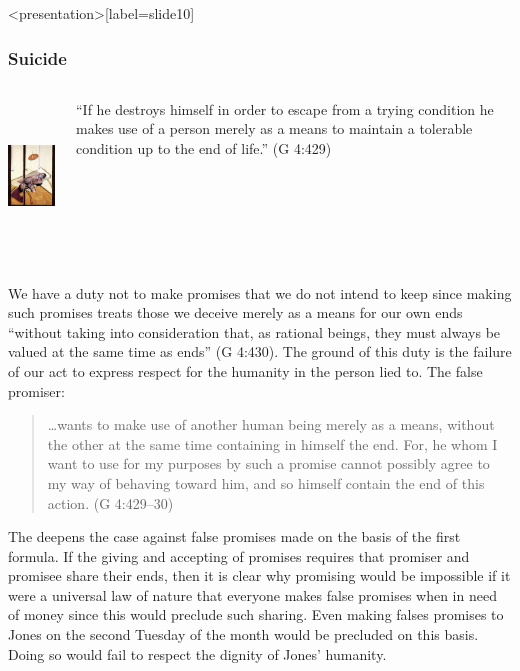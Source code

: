 \begin{frame}<presentation>[label=slide10]
    \frametitle{Suicide}
        \begin{columns}
            \begin{column}{3cm}
                \includegraphics[height=4cm]{../../../graphics/suicide.jpg}
            \end{column}
            \begin{column}{7cm}
                ``If he destroys himself in order to escape from a trying condition he makes use of a person merely as a means to maintain a tolerable condition up to the end of life.'' (G 4:429)
            \end{column}
        \end{columns}
\end{frame}

We have a duty not to make promises that we do not intend to keep since making such promises treats those we deceive merely as a means for our own ends ``without taking into consideration that, as rational beings, they must always be valued at the same time as ends'' (G 4:430). The ground of this duty is the failure of our act to express respect for the humanity in the person lied to. The false promiser:
\begin{quote}
	\ldots wants to make use of another human being merely as a means, without the other at the same time containing in himself the end. For, he whom I want to use for my purposes by such a promise cannot possibly agree to my way of behaving toward him, and so himself contain the end of this action. (G 4:429--30)
\end{quote}

The deepens the case against false promises made on the basis of the first formula. If the giving and accepting of promises requires that promiser and promisee share their ends, then it is clear why promising would be impossible if it were a universal law of nature that everyone makes false promises when in need of money since this would preclude such sharing. Even making falses promises to Jones on the second Tuesday of the month would be precluded on this basis. Doing so would fail to respect the dignity of Jones’ humanity. \change

